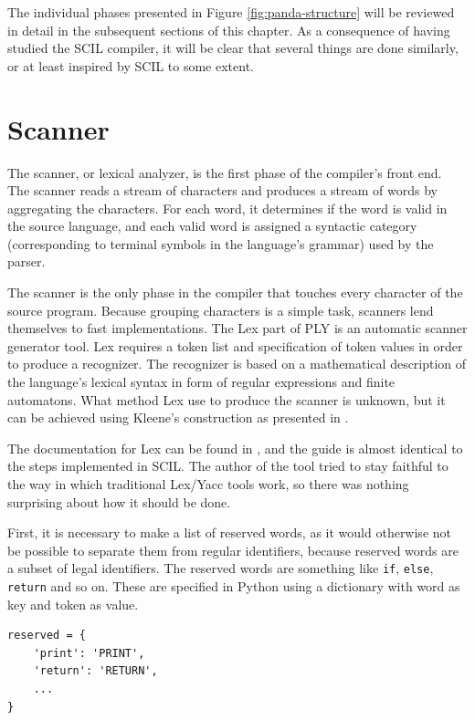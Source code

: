 The individual phases presented in Figure \ref{fig:panda-structure} will be reviewed in detail in the subsequent sections of this chapter. As a consequence of having studied the SCIL compiler, it will be clear that several things are done similarly, or at least inspired by SCIL to some extent. 

\section{Scanner}
The scanner, or lexical analyzer, is the first phase of the compiler's front end. The scanner reads a stream of characters and produces a stream of words by aggregating the characters. For each word, it determines if the word is valid in the source language, and each valid word is assigned a syntactic category (corresponding to terminal symbols in the language's grammar) used by the parser. 

The scanner is the only phase in the compiler that touches every character of the source program. Because grouping characters is a simple task, scanners lend themselves to fast implementations. The Lex part of PLY is an automatic scanner generator tool. Lex requires a token list and specification of token values in order to produce a recognizer. The recognizer is based on a mathematical description of the language's lexical syntax in form of regular expressions and finite automatons. What method Lex use to produce the scanner is unknown, but it can be achieved using Kleene's construction as presented in \cite[45]{EnginneringACompiler}.

The documentation for Lex can be found in \cite[section 4][]{ply}, and the guide is almost identical to the steps implemented in SCIL. The author of the tool tried to stay faithful to the way in which traditional Lex/Yacc tools work, so there was nothing surprising about how it should be done.

First, it is necessary to make a list of reserved words, as it would otherwise not be possible to separate them from regular identifiers, because reserved words are a subset of legal identifiers. The reserved words are something like \texttt{if}, \texttt{else}, \texttt{return} and so on. These are specified in Python using a dictionary with word as key and token as value.

\begin{verbatim}
reserved = {
    'print': 'PRINT',
    'return': 'RETURN',
    ...
}
\end{verbatim}

